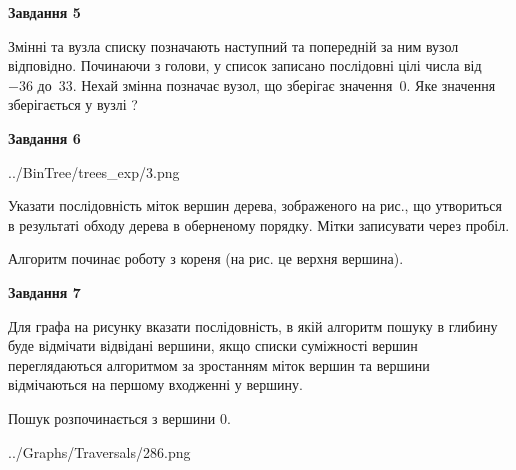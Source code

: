 \documentclass[12pt, ukrainian]{article}
\begin{document}
{\begin {large}
{\begin {center}\textbf{Завдання 5}\end {center}}\par
Змінні  та  вузла списку позначають наступний та попередній за ним вузол відповідно. Починаючи з голови, у список записано послідовні цілі числа від~$-36$ до~$33$. Нехай змінна  позначає вузол, що зберігає значення~$0$.
Яке значення зберігається у вузлі  ?\par
\newpage

{\begin {center}\textbf{Завдання 6}\end {center}}\par

\begin{center}
	{../BinTree/trees_exp/3.png}
\end{center}
Указати послідовність міток вершин дерева, зображеного на рис., що утвориться в результаті обходу дерева в оберненому порядку. Мітки записувати через пробіл.\par Алгоритм починає роботу з кореня (на рис. це верхня вершина).\par
\newpage

{\begin {center}\textbf{Завдання 7}\end {center}}\par
Для графа на рисунку вказати послідовність, в якій алгоритм пошуку в глибину буде відмічати відвідані вершини, якщо списки суміжності вершин переглядаються алгоритмом за зростанням міток вершин та вершини відмічаються на першому вход\-женні у вершину.\par
Пошук розпочинається з вершини 0.\par

\begin{center}
	{../Graphs/Traversals/286.png}
\end{center}\par
\newpage


\end{large}}
\end{document}
